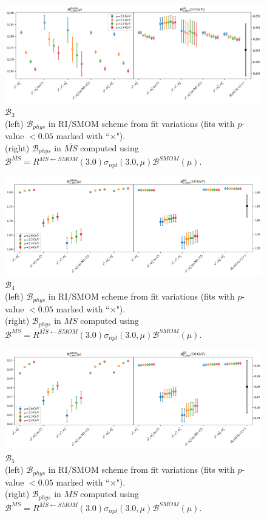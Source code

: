 \documentclass[12pt]{extarticle}
\begin{document}
\begin{figure}
\centering
\includegraphics[page=1, width=1.1\textwidth]{SSmPP/SUSY/fit_summary_bag.pdf}
\caption{$\mathcal{B}_{3}$\\(left) $\mathcal{B}_{phys}$ in RI/SMOM scheme from fit variations (fits with $p$-value $<0.05$ marked with ``$\times$"). \\(right) $\mathcal{B}_{phys}$ in $\overline{MS}$ computed using $\mathcal{B}^{\overline{MS}} = R^{\overline{MS}\leftarrow SMOM}(3.0)\sigma_{npt}(3.0,\mu) \mathcal{B}^{SMOM}(\mu)$.}
\end{figure}
\clearpage
\begin{figure}
\centering
\includegraphics[page=1, width=1.1\textwidth]{SSpPP/SUSY/fit_summary_bag.pdf}
\caption{$\mathcal{B}_{4}$\\(left) $\mathcal{B}_{phys}$ in RI/SMOM scheme from fit variations (fits with $p$-value $<0.05$ marked with ``$\times$"). \\(right) $\mathcal{B}_{phys}$ in $\overline{MS}$ computed using $\mathcal{B}^{\overline{MS}} = R^{\overline{MS}\leftarrow SMOM}(3.0)\sigma_{npt}(3.0,\mu) \mathcal{B}^{SMOM}(\mu)$.}
\end{figure}
\clearpage
\begin{figure}
\centering
\includegraphics[page=1, width=1.1\textwidth]{TT/SUSY/fit_summary_bag.pdf}
\caption{$\mathcal{B}_{5}$\\(left) $\mathcal{B}_{phys}$ in RI/SMOM scheme from fit variations (fits with $p$-value $<0.05$ marked with ``$\times$"). \\(right) $\mathcal{B}_{phys}$ in $\overline{MS}$ computed using $\mathcal{B}^{\overline{MS}} = R^{\overline{MS}\leftarrow SMOM}(3.0)\sigma_{npt}(3.0,\mu) \mathcal{B}^{SMOM}(\mu)$.}
\end{figure}
\end{document}
